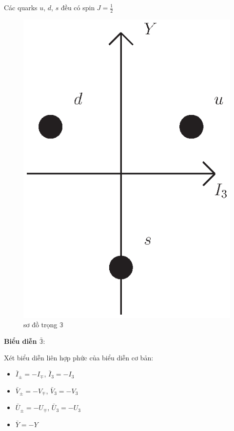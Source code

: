 \documentclass{report}
\begin{document}
Các quarks \( u \), \( d\), \( s\) đều có spin \( J = \frac{1}{2} \)

	\begin{figure}[!htb]
		\centering
		\includegraphics[scale=0.5]{diagram2.eps}
		\caption{sơ đồ trọng \( \mathbb{3} \)}
	\end{figure}
	
\textbf{Biểu diễn \( \bar{ \mathbb{3} } \)}:
	
Xét biểu diễn liên hợp phức của biểu diễn cơ bản:

	\begin{itemize}
		\item \( \bar{I}_{\pm} = - I_{ \mp } \), \hspace*{0.5cm} \( \bar{I}_{3} = - I_{ 3 } \)
		\item \( \bar{V}_{\pm} = - V_{ \mp } \), \hspace*{0.4cm} \( \bar{V}_{3} = - V_{ 3 } \)
		\item \( \bar{U}_{\pm} = - U_{ \mp } \), \hspace*{0.4cm} \( \bar{U}_{3} = - U_{ 3 } \)
		\item \( \bar{Y} = - Y \)
	\end{itemize}
	
\end{document}
